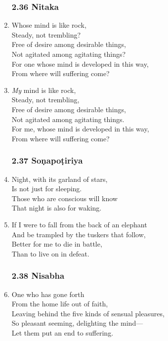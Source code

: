 \documentclass[10pt, openany]{book}
\begin{document}
\begin{enumerate}
\subsubsection*{2.36 Nitaka}

\item Whose mind is like rock,\\
Steady, not trembling?\\
Free of desire among desirable things,\\
Not agitated among agitating things?\\
For one whose mind is developed in this way,\\
From where will suffering come?

\item \emph{My} mind is like rock,\\
Steady, not trembling,\\
Free of desire among desirable things,\\
Not agitated among agitating things.\\
For me, whose mind is developed in this way,\\
From where will suffering come?

\subsubsection*{2.37 Soṇapoṭiriya}

\item Night, with its garland of stars,\\
Is not just for sleeping.\\
Those who are conscious will know\\
That night is also for waking.

\item If I were to fall from the back of an elephant\\
And be trampled by the tuskers that follow,\\
Better for me to die in battle,\\
Than to live on in defeat.

\subsubsection*{2.38 Nisabha}

\item One who has gone forth \\
From the home life out of faith,\\
Leaving behind the five kinds of sensual pleasures,\\
So pleasant seeming, delighting the mind—\\
Let them put an end to suffering.


\end{enumerate}
\end{document}
